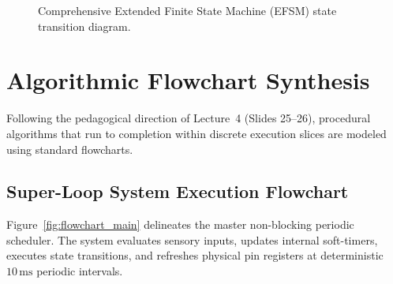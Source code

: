 \documentclass[12pt]{article}
\begin{document}
\begin{figure}[H]
{
}
\caption{Comprehensive Extended Finite State Machine (EFSM) state transition diagram.}
\label{fig:fsm_diagram}
\end{figure}

\section{Algorithmic Flowchart Synthesis}

Following the pedagogical direction of Lecture~4 (Slides 25--26), procedural algorithms that run to completion within discrete execution slices are modeled using standard flowcharts.

\subsection{Super-Loop System Execution Flowchart}
Figure~\ref{fig:flowchart_main} delineates the master non-blocking periodic scheduler. The system evaluates sensory inputs, updates internal soft-timers, executes state transitions, and refreshes physical pin registers at deterministic $10\,\text{ms}$ periodic intervals.
\end{document}
